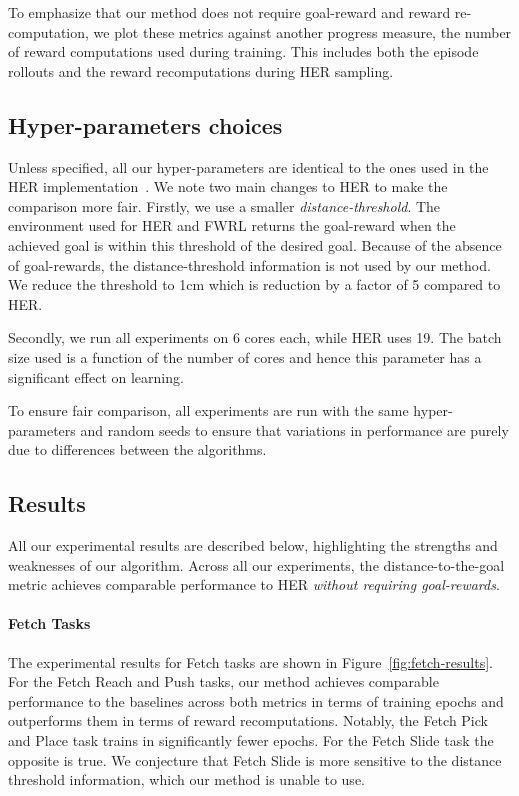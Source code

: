 To emphasize that our method does not require goal-reward
and reward re-computation, we plot these metrics against another
progress measure, the number of reward computations used during
training. This includes both the episode rollouts and the reward recomputations
during HER sampling.

%


\subsection{Hyper-parameters choices} \label{sec:hyperparams}
Unless specified, all our hyper-parameters are identical to the ones
used in the HER
implementation~\citep{dhariwal2017baselines}. We note two main changes
to HER to make the comparison more fair. Firstly,
we use a smaller \emph{distance-threshold}.
The environment used for HER and FWRL returns the goal-reward when the
achieved goal is within this threshold of the desired goal. Because of
the absence of goal-rewards, the distance-threshold information is not used by our
method.
We reduce the threshold to 1cm which is reduction by a factor of 5 compared to
HER.

Secondly, we run all experiments on 6 cores each,
while HER uses 19. The batch size used is a function of the number of
cores and hence this parameter has a significant effect on learning. 

To ensure fair comparison, all experiments are run with the same hyper-parameters and
random seeds to ensure that variations in performance are purely due
to differences between the algorithms.

\subsection{Results}
All our experimental results are described below, highlighting the strengths and
weaknesses of our algorithm. Across all our experiments, the
distance-to-the-goal metric achieves comparable performance to HER
\emph{without requiring goal-rewards}. 

\paragraph{Fetch Tasks}

The experimental results for Fetch tasks are shown in
Figure~\ref{fig:fetch-results}. For the Fetch Reach and Push tasks, our
method achieves comparable performance to the baselines 
across both metrics in terms of training epochs and outperforms them in
terms of reward recomputations. Notably, the Fetch
Pick and Place task trains in significantly fewer epochs. For the Fetch
Slide task the opposite is true.
We conjecture that Fetch Slide is more sensitive to the
distance threshold information, which our method is unable to use.

